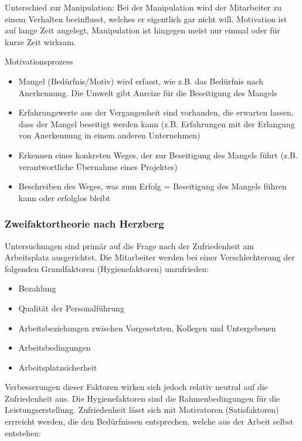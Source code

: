 Unterschied zur Manipulation: Bei der Manipulation wird der Mitarbeiter zu einem Verhalten beeinflusst, welches er eigentlich gar nicht will.
Motivation ist auf lange Zeit angelegt, Manipulation ist hingegen meist nur einmal oder für kurze Zeit wirksam.

Motivationsprozess
\begin{itemize}
	\item Mangel (Bedürfnis/Motiv) wird erfasst, wie z.B. das Bedürfnis nach Anerkennung. Die Umwelt gibt Anreize für die Beseitigung des Mangels
	\item Erfahrungswerte aus der Vergangenheit sind vorhanden, die erwarten lassen, dass der Mangel beseitigt werden kann (z.B. Erfahrungen mit der Erlangung von Anerkennung in einem anderen Unternehmen)
	\item Erkennen eines konkreten Weges, der zur Beseitigung des Mangels führt (z.B. verantwortliche Übernahme eines Projektes)
	\item Beschreiben des Weges, was zum Erfolg = Beseitigung des Mangels führen kann oder erfolglos bleibt
\end{itemize}

\subsubsection{Zweifaktortheorie nach Herzberg}

Untersuchungen sind primär auf die Frage nach der Zufriedenheit am Arbeitsplatz ausgerichtet. Die Mitarbeiter werden bei einer Verschlechterung der folgenden Grundfaktoren (Hygienefaktoren) unzufrieden:

\begin{itemize}
	\item Bezahlung
	\item Qualität der Personalführung
	\item Arbeitsbeziehungen zwischen Vorgesetzten, Kollegen und Untergebenen
	\item Arbeitsbedingungen
	\item Arbeitsplatzsicherheit
\end{itemize}

Verbesserungen dieser Faktoren wirken sich jedoch relativ neutral auf die Zufriedenheit aus. Die Hygienefaktoren sind die Rahmenbedingungen für die Leistungserstellung. Zufriedenheit lässt sich mit Motivatoren (Satisfaktoren) errreicht werden, die den Bedürfnissen entsprechen, welche aus der Arbeit selbst entstehen:

